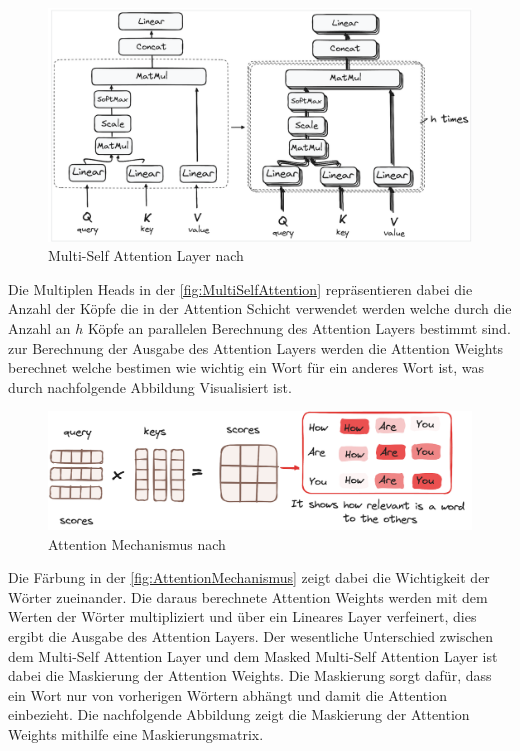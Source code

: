 \documentclass[conference]{IEEEtran}
\begin{document}
\begin{figure}[htbp]
    \centerline{\includegraphics[width=\linewidth]{Bilder/MultiheadSelfAttention.png}}
    \caption{Multi-Self Attention Layer nach \cite{}}
\label{fig:MultiSelfAttention}
\end{figure}
Die Multiplen Heads in der \autoref{fig:MultiSelfAttention} repräsentieren dabei die Anzahl der Köpfe die in der Attention Schicht verwendet werden welche durch die Anzahl an $h$ Köpfe an parallelen Berechnung des Attention Layers bestimmt sind.
zur Berechnung der Ausgabe des Attention Layers werden die Attention Weights berechnet welche bestimen wie wichtig ein Wort für ein anderes Wort ist, was durch nachfolgende Abbildung Visualisiert ist.
\begin{figure}[htbp]
    \centerline{\includegraphics[width=\linewidth]{Bilder/AttentionMechanismus.png}}
    \caption{Attention Mechanismus nach \cite{}}
\label{fig:AttentionMechanismus}
\end{figure}
Die Färbung in der \autoref{fig:AttentionMechanismus} zeigt dabei die Wichtigkeit der Wörter zueinander. Die daraus berechnete Attention Weights werden mit dem Werten der Wörter multipliziert und über ein Lineares Layer verfeinert, dies ergibt die Ausgabe des Attention Layers. Der wesentliche Unterschied zwischen dem Multi-Self Attention Layer und dem Masked Multi-Self Attention Layer ist dabei die Maskierung der Attention Weights. Die Maskierung sorgt dafür, dass ein Wort nur von vorherigen Wörtern abhängt und damit die Attention einbezieht. Die nachfolgende Abbildung zeigt die Maskierung der Attention Weights mithilfe eine Maskierungsmatrix.
\end{document}
